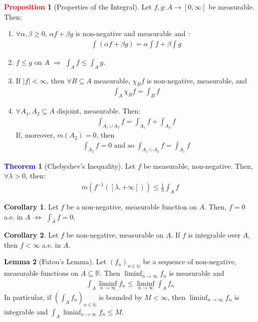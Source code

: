 \documentclass[11pt]{article}
\theoremstyle{definition}
\newcommand{\bb}[1]{\mathbb{#1}}
\newtheorem{theorem}{\textcolor{blue}{Theorem}}
\newtheorem{corollary}{Corollary}
\newtheorem{lemma}[theorem]{Lemma}
\theoremstyle{definition}
\newtheorem{prop}{\textcolor{red}{Proposition}}
\theoremstyle{remark}
\begin{document}
\begin{prop}[Properties of the Integral] Let $f, g: A \rightarrow [0, \infty]$ be measurable. Then: 
\begin{enumerate}[noitemsep]
	\item $\forall \alpha, \beta \geq 0$, $\alpha f + \beta g$ is non-negative and measurable and :
	\begin{align*}
		\int (\alpha f + \beta g) = \alpha \int f + \beta \int g 	
	\end{align*}
	\item $f \leq g$ on $A$ $\Rightarrow$ $\int_A f \leq \int_A g$. 
	\item If $|f| < \infty$, then $\forall B \subseteq A$ measurable, $\chi_B f$ is non-negative, measurable, and 
	\begin{align*}
		\int_A \chi_B f = \int_B f 	
	\end{align*}
	\item $\forall A_1, A_2 \subseteq A$ disjoint, measurable. Then: 
	\begin{align*}
		\int_{A_1 \cup A_2} f = \int_{A_1} f + \int_{A_2} f 	
	\end{align*}
	If, moreover, $m(A_2) = 0$, then
	\begin{align*}
		\int_{A_2} f = 0 \mbox{ and so } \int_{A_1 \cup A_2}f = \int_{A_1} f	
	\end{align*}
\end{enumerate}
\end{prop}


\begin{theorem}[Chebyshev's Inequality] 
	Let $f$ be measurable, non-negative. Then, $\forall \lambda > 0$, then: 
	\begin{align*}
		m (f^{-1}([\lambda, + \infty] )) \leq \frac{1}{\lambda} \int_A f 	
	\end{align*}
\end{theorem}

\begin{corollary}
	Let $f$ be a non-negative, measurable function on $A$. Then, $f = 0$ a.e. in $A$ $\iff$ $\int_A f = 0$. 
\end{corollary}

\begin{corollary}
	Let $f$ be non-negative, measurable on $A$. If $f$ is integrable over $A$, then $f < \infty$ a.e. in $A$. 
\end{corollary}

\begin{lemma}[Fatou's Lemma] 
	Let $(f_n)_{n \in \bb{N}}$ be a sequence of non-negative, measurable functions on $A \subseteq \bb{R}$. Then $\liminf_{n \rightarrow \infty} f_n $ is measurable and 
	\begin{align}
		\int_A \liminf_{n \rightarrow \infty} f_n \leq \liminf_{n \rightarrow \infty} \int_A f_n 
	\end{align}
	In particular, if $(\int_A f_n)_{n \in \bb{N}}$ is bounded by $M < \infty$, then $\liminf_{n \rightarrow \infty} f_n$ is integrable and $\int_A \liminf_{n \rightarrow \infty} f_n \leq M$. 
\end{lemma}
\end{document}
